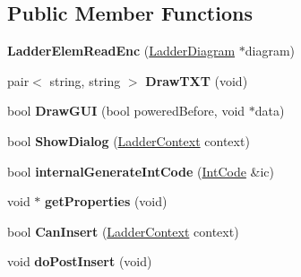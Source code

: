 \subsection*{Public Member Functions}
\begin{DoxyCompactItemize}
\item 
\hypertarget{class_ladder_elem_read_enc_a38e166df9fde25275282b9a2ac6e041f}{{\bfseries Ladder\-Elem\-Read\-Enc} (\hyperlink{class_ladder_diagram}{Ladder\-Diagram} $\ast$diagram)}\label{class_ladder_elem_read_enc_a38e166df9fde25275282b9a2ac6e041f}

\item 
\hypertarget{class_ladder_elem_read_enc_a555776a3da805a596ce85c1a48a47bc6}{pair$<$ string, string $>$ {\bfseries Draw\-T\-X\-T} (void)}\label{class_ladder_elem_read_enc_a555776a3da805a596ce85c1a48a47bc6}

\item 
\hypertarget{class_ladder_elem_read_enc_a1da6125cee20746467021638136790d0}{bool {\bfseries Draw\-G\-U\-I} (bool powered\-Before, void $\ast$data)}\label{class_ladder_elem_read_enc_a1da6125cee20746467021638136790d0}

\item 
\hypertarget{class_ladder_elem_read_enc_adb875f9629e34c2c6a321bce7691dc58}{bool {\bfseries Show\-Dialog} (\hyperlink{struct_ladder_context}{Ladder\-Context} context)}\label{class_ladder_elem_read_enc_adb875f9629e34c2c6a321bce7691dc58}

\item 
\hypertarget{class_ladder_elem_read_enc_ab9ef41c7c158a60343a3339d8be4876a}{bool {\bfseries internal\-Generate\-Int\-Code} (\hyperlink{class_int_code}{Int\-Code} \&ic)}\label{class_ladder_elem_read_enc_ab9ef41c7c158a60343a3339d8be4876a}

\item 
\hypertarget{class_ladder_elem_read_enc_a9be752bf18066f878ca00c80493f8b84}{void $\ast$ {\bfseries get\-Properties} (void)}\label{class_ladder_elem_read_enc_a9be752bf18066f878ca00c80493f8b84}

\item 
\hypertarget{class_ladder_elem_read_enc_a7c4be7738c7b33a10a7ed284c7b249a3}{bool {\bfseries Can\-Insert} (\hyperlink{struct_ladder_context}{Ladder\-Context} context)}\label{class_ladder_elem_read_enc_a7c4be7738c7b33a10a7ed284c7b249a3}

\item 
\hypertarget{class_ladder_elem_read_enc_ae5838b3713f0bffe30c59fc728a0683e}{void {\bfseries do\-Post\-Insert} (void)}\label{class_ladder_elem_read_enc_ae5838b3713f0bffe30c59fc728a0683e}


\end{DoxyCompactItemize}
